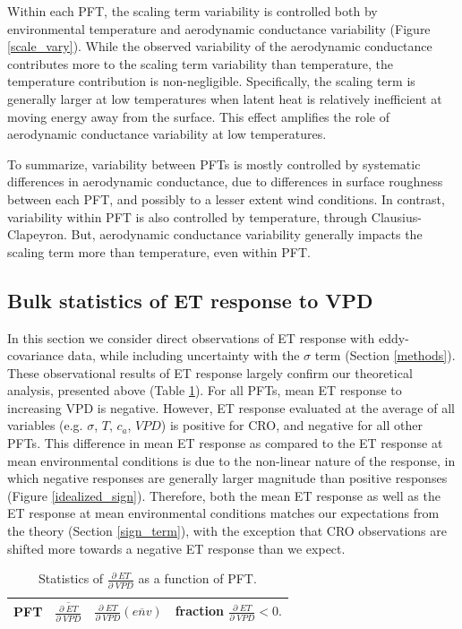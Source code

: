 \documentclass[draft,linenumbers]{agujournal}
\begin{document}
Within each PFT, the scaling term variability is controlled both by
environmental temperature and aerodynamic conductance variability
(Figure \ref{scale_vary}). While the observed variability of the
aerodynamic conductance contributes more to the scaling term
variability than temperature, the temperature contribution is
non-negligible. Specifically, the scaling term is generally larger at
low temperatures when latent heat is relatively inefficient at moving
energy away from the surface. This effect amplifies the role of
aerodynamic conductance variability at low temperatures.

To summarize, variability between PFTs is mostly controlled by
systematic differences in aerodynamic conductance, due to differences
in surface roughness between each PFT, and possibly to a lesser extent
wind conditions. In contrast, variability within PFT is also
controlled by temperature, through Clausius-Clapeyron. But,
aerodynamic conductance variability generally impacts the scaling term
more than temperature, even within PFT.

\subsection{Bulk statistics of ET response to VPD}
\label{stats_sec}

In this section we consider direct observations of ET response with
eddy-covariance data, while including uncertainty with the $\sigma$
term (Section \ref{methods}). These observational results of ET
response largely confirm our theoretical analysis, presented above
(Table \ref{stats}). For all PFTs, mean ET response to increasing VPD
is negative. However, ET response evaluated at the average of all
variables (e.g. $\sigma$, $T$, $c_a$, $VPD$) is positive for CRO, and
negative for all other PFTs. This difference in mean ET response as
compared to the ET response at mean environmental conditions is due to
the non-linear nature of the response, in which negative responses are
generally larger magnitude than positive responses (Figure
\ref{idealized_sign}). Therefore, both the mean ET response as well as
the ET response at mean environmental conditions matches our
expectations from the theory (Section \ref{sign_term}), with the
exception that CRO observations are shifted more towards a negative ET
response than we expect.

\begin{table}
  \caption{Statistics of $\frac{\partial \; ET}{\partial \; VPD}$ as a
    function of PFT.}
  \centering
  \begin{tabular}{l c c c}
    \hline
    PFT & $\overline{\frac{\partial \; ET}{\partial \; VPD}}$ & $\frac{\partial \; ET}{\partial \; VPD}\left(\overline{env}\right)$ & fraction $\frac{\partial \; ET}{\partial \; VPD} < 0.$ \\
    \hline
    
    \hline
  \end{tabular}
  \label{stats}
\end{table}
\end{document}
